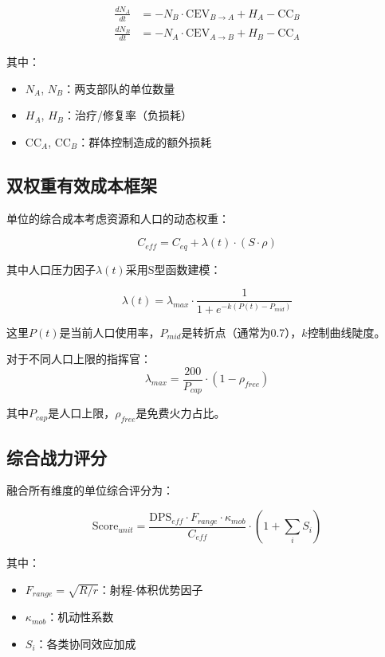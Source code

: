 \documentclass[a4paper,12pt]{article}
\begin{document}
\begin{align}
\frac{dN_A}{dt} &= -N_B \cdot \text{CEV}_{B \rightarrow A} + H_A - \text{CC}_B \\
\frac{dN_B}{dt} &= -N_A \cdot \text{CEV}_{A \rightarrow B} + H_B - \text{CC}_A
\end{align}

其中：
\begin{itemize}
\item $N_A$, $N_B$：两支部队的单位数量
\item $H_A$, $H_B$：治疗/修复率（负损耗）
\item $\text{CC}_A$, $\text{CC}_B$：群体控制造成的额外损耗
\end{itemize}

\subsection{双权重有效成本框架}
单位的综合成本考虑资源和人口的动态权重：

\begin{equation}
C_{eff} = C_{eq} + \lambda(t) \cdot (S \cdot \rho)
\end{equation}

其中人口压力因子$\lambda(t)$采用S型函数建模：

\begin{equation}
\lambda(t) = \lambda_{max} \cdot \frac{1}{1 + e^{-k(P(t) - P_{mid})}}
\end{equation}

这里$P(t)$是当前人口使用率，$P_{mid}$是转折点（通常为0.7），$k$控制曲线陡度。

对于不同人口上限的指挥官：
\begin{equation}
\lambda_{max} = \frac{200}{P_{cap}} \cdot (1 - \rho_{free})
\end{equation}

其中$P_{cap}$是人口上限，$\rho_{free}$是免费火力占比。

\subsection{综合战力评分}
融合所有维度的单位综合评分为：

\begin{equation}
\text{Score}_{unit} = \frac{\text{DPS}_{eff} \cdot F_{range} \cdot \kappa_{mob}}{C_{eff}} \cdot (1 + \sum_{i} S_i)
\end{equation}

其中：
\begin{itemize}
\item $F_{range} = \sqrt{R/r}$：射程-体积优势因子
\item $\kappa_{mob}$：机动性系数
\item $S_i$：各类协同效应加成
\end{itemize}
\end{document}
